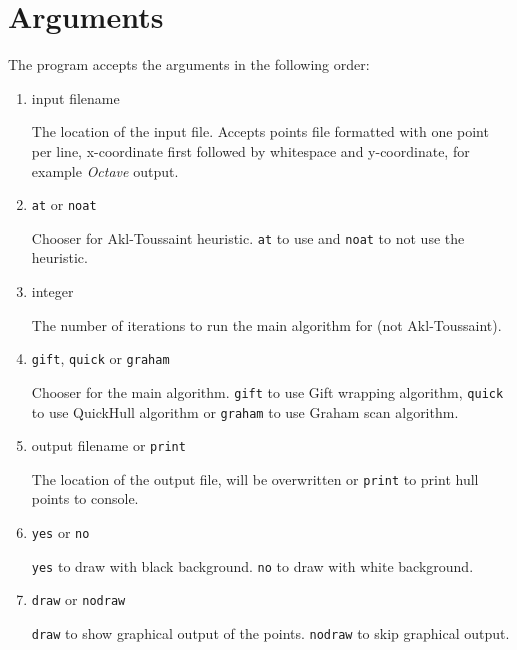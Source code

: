 \documentclass[a4paper,12pt,leqno,titlepage]{article}
\begin{document}
\section{Arguments}
The program accepts the arguments in the following order:
\begin{enumerate}
\item input filename

The location of the input file. Accepts points file formatted with one point per line, x-coordinate first followed by whitespace and y-coordinate, for example \emph{Octave} output.

\item \texttt{at} or \texttt{noat}

Chooser for Akl-Toussaint heuristic. \texttt{at} to use and \texttt{noat} to not use the heuristic.

\item integer

The number of iterations to run the main algorithm for (not Akl-Toussaint).

\item \texttt{gift}, \texttt{quick} or \texttt{graham}

Chooser for the main algorithm.
\texttt{gift} to use Gift wrapping algorithm,
\texttt{quick} to use QuickHull algorithm or
\texttt{graham} to use Graham scan algorithm.

\item output filename or \texttt{print}

The location of the output file, will be overwritten or \texttt{print} to print hull points to console.

\item \texttt{yes} or \texttt{no}

\texttt{yes} to draw with black background. \texttt{no} to draw with white background.

\item \texttt{draw} or \texttt{nodraw}

\texttt{draw} to show graphical output of the points. \texttt{nodraw} to skip graphical output.
\end{enumerate}

\pagebreak
\end{document}
